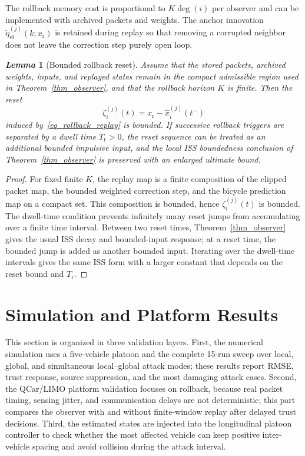 \documentclass[journal,twoside]{IEEEtran}
\newtheorem{lemma}{\it Lemma}%
\begin{document}
The rollback memory cost is proportional to $K\deg(i)$ per observer and can be implemented with archived packets and weights. The anchor innovation $\tilde{\eta}_{i0}^{(j)}(k;x_{\mathrm{r}})$ is retained during replay so that removing a corrupted neighbor does not leave the correction step purely open loop.

\begin{lemma}[Bounded rollback reset]\label{lem_rollback_bounded}
Assume that the stored packets, archived weights, inputs, and replayed states remain in the compact admissible region used in Theorem~\ref{thm_observer}, and that the rollback horizon $K$ is finite. Then the reset
\[
    \zeta_i^{(j)}(t)=x_{\mathrm r}-\hat{x}_i^{(j)}(t^-)
\]
induced by~\eqref{eq_rollback_replay} is bounded. If successive rollback triggers are separated by a dwell time $T_{\mathrm r}>0$, the reset sequence can be treated as an additional bounded impulsive input, and the local ISS boundedness conclusion of Theorem~\ref{thm_observer} is preserved with an enlarged ultimate bound.
\end{lemma}
\begin{proof}
For fixed finite $K$, the replay map is a finite composition of the clipped packet map, the bounded weighted correction step, and the bicycle prediction map on a compact set. This composition is bounded, hence $\zeta_i^{(j)}(t)$ is bounded. The dwell-time condition prevents infinitely many reset jumps from accumulating over a finite time interval. Between two reset times, Theorem~\ref{thm_observer} gives the usual ISS decay and bounded-input response; at a reset time, the bounded jump is added as another bounded input. Iterating over the dwell-time intervals gives the same ISS form with a larger constant that depends on the reset bound and $T_{\mathrm r}$.
\end{proof}

\section{Simulation and Platform Results}\label{sec_simulation}

This section is organized in three validation layers. First, the numerical simulation uses a five-vehicle platoon and the complete 15-run sweep over local, global, and simultaneous local--global attack modes; these results report RMSE, trust response, source suppression, and the most damaging attack cases. Second, the QCar/LIMO platform validation focuses on rollback, because real packet timing, sensing jitter, and communication delays are not deterministic; this part compares the observer with and without finite-window replay after delayed trust decisions. Third, the estimated states are injected into the longitudinal platoon controller to check whether the most affected vehicle can keep positive inter-vehicle spacing and avoid collision during the attack interval.
\end{document}
